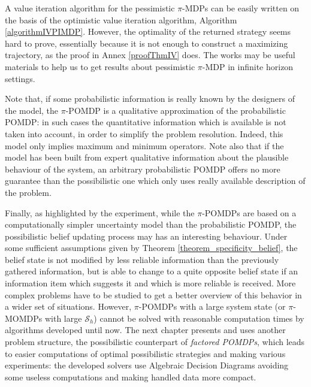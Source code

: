 A value iteration algorithm for the pessimistic $\pi$-MDPs 
can be easily written on the basis of the optimistic value iteration algorithm,
Algorithm \ref{algorithmIVPIMDP}.
However, the optimality of the returned strategy seems 
hard to prove, essentially because it is not enough 
to construct a maximizing trajectory, 
as the proof in Annex \ref{proofThmIV} does. 
The works \cite{LIP61498,DBLP:books/daglib/0024909} 
may be useful materials to help us to get results about pessimistic 
$\pi$-MDP in infinite horizon settings.

Note that, if some probabilistic information 
is really known by the designers of the model,
the $\pi$-POMDP is a qualitative approximation
of the probabilistic POMDP: in such cases
the quantitative information which is available
is not taken into account, in order to simplify 
the problem resolution.
Indeed, this model only implies maximum and minimum operators.
Note also that if the model has been built from expert 
qualitative information about the plausible behaviour of the system,
an arbitrary probabilistic POMDP offers no more guarantee than
the possibilistic one 
which only uses really available description of the problem.

Finally, as highlighted by the experiment,
while the $\pi$-POMDPs are
based on a computationally simpler uncertainty model 
than the probabilistic POMDP,
the possibilistic belief updating process may 
has an interesting behaviour.
Under some sufficient assumptions
given by Theorem \ref{theorem_specificity_belief},
the belief state is not modified 
by less reliable information
than the previously gathered information, 
but is able to change to a quite opposite belief state
if an information item which suggests it and which is more reliable is received.
More complex problems have to be studied 
to get a better overview of this behavior
in a wider set of situations.
However, $\pi$-POMDPs with a large system state
(or $\pi$-MOMDPs with large $\mathcal{S}_h$) 
cannot be solved with reasonable computation times 
by algorithms developed until now.
The next chapter presents and uses another problem structure,
the possibilistic counterpart of \textit{factored POMDPs},
which leads to easier computations of optimal possibilistic strategies 
and making various experiments:
the developed solvers use Algebraic Decision Diagrams
avoiding some useless computations
and making handled data more compact.
